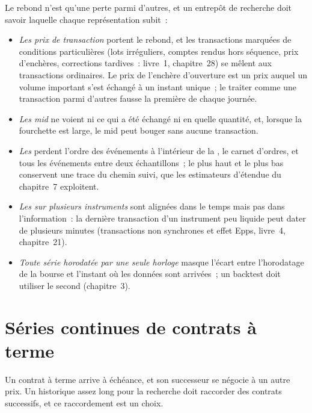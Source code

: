 Le rebond n'est qu'une perte parmi d'autres, et un entrepôt de recherche doit savoir laquelle chaque représentation subit~:
\begin{itemize}
\item \emph{Les prix de transaction} portent le rebond, et les transactions marquées de conditions particulières (lots irréguliers, comptes rendus hors séquence,
prix d'enchères, corrections tardives~: livre~1, chapitre~28) se mêlent aux transactions ordinaires. Le prix de l'enchère d'ouverture est un prix auquel un
volume important s'est échangé à un instant unique~; le traiter comme une transaction parmi d'autres fausse la première  de chaque journée.
\item \emph{Les mid} ne voient ni ce qui a été échangé ni en quelle quantité, et, lorsque la fourchette est large, le mid peut bouger sans aucune transaction.
\item \emph{Les } perdent l'ordre des événements à l'intérieur de la , le carnet d'ordres, et tous les événements entre deux échantillons~; le plus haut et le plus bas conservent une
trace du chemin suivi, que les estimateurs d'étendue du chapitre~7 exploitent.
\item \emph{Les  sur plusieurs instruments} sont alignées dans le temps mais pas dans l'information~: la dernière transaction d'un instrument peu liquide
peut dater de plusieurs minutes (transactions non synchrones et effet Epps, livre~4, chapitre~21).
\item \emph{Toute série horodatée par une seule horloge} masque l'écart entre l'horodatage de la bourse et l'instant où les données
sont arrivées~; un backtest doit utiliser le second (chapitre~3).
\end{itemize}

\section{Séries continues de contrats à terme}

Un contrat à terme arrive à échéance, et son successeur se négocie à un autre prix. Un historique assez long pour la recherche doit raccorder des
contrats successifs, et ce raccordement est un choix.

